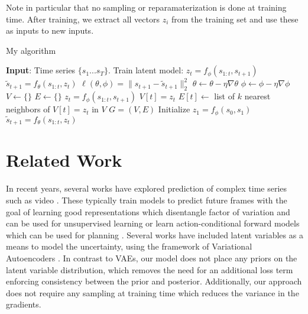 \documentclass{article}
\begin{document}
Note in particular that no sampling or reparamaterization is done at training time.
After training, we extract all vectors $z_i$ from the training set and use these as inputs to new inputs.

\begin{algorithm}
  \caption{My algorithm}\label{euclid}
  \begin{algorithmic}[1]
    \State \textbf{Input}: Time series $\{s_1...s_T\}$.
    \State Train latent model:
    \State $z_t = f_{\phi}(s_{1:t}, s_{t+1})$
    \State $\tilde{s}_{t+1} = f_{\theta}(s_{1:t}, z_t)$
    \State $\ell(\theta, \phi) = \|s_{t+1} - \tilde{s}_{t+1} \|_2^2$
    \State $\theta \leftarrow \theta - \eta \nabla \theta$
    \State $\phi \leftarrow \phi - \eta \nabla \phi$
    \EndWhile
    \State $V \leftarrow \{ \}$
    \State $E \leftarrow \{ \}$
    \State $z_t = f_{\phi}(s_{1:t}, s_{t+1})$
    \State $V[t] = z_t$
    \EndFor
    \State $E[t] \leftarrow $ list of $k$ nearest neighbors of $V[t] = z_t$ in $V$
    \EndFor
    \Return $G = (V, E)$
    \EndProcedure
    \State Initialize $z_1 = f_{\phi}(s_0, s_1)$
    \State $\tilde{s}_{t+1} = f_{\theta}(s_{1:t}, z_t)$
    \EndFor
    \EndProcedure
  \end{algorithmic}
\end{algorithm}


\section{Related Work}

In recent years, several works have explored prediction of complex time series such as video \citep{mathieu-iclr-2016}. These typically train models to predict future frames with the goal of learning good representations which disentangle factor of variation and can be used for unsupervised learning \citep{Srivastava15, Villegas17, DentonB17} or learn action-conditional forward models which can be used for planning \citep{Oh15, FinnGL16, Poke, VideoPixel}. Several works have included latent variables as a means to model the uncertainty, using the framework of Variational Autoencoders \citep{Babaeizadeh2018, Denton2018}. In contrast to VAEs, our model does not place any priors on the latent variable distribution, which removes the need for an additional loss term enforcing consistency between the prior and posterior. Additionally, our approach does not require any sampling at training time which reduces the variance in the gradients.
\end{document}
